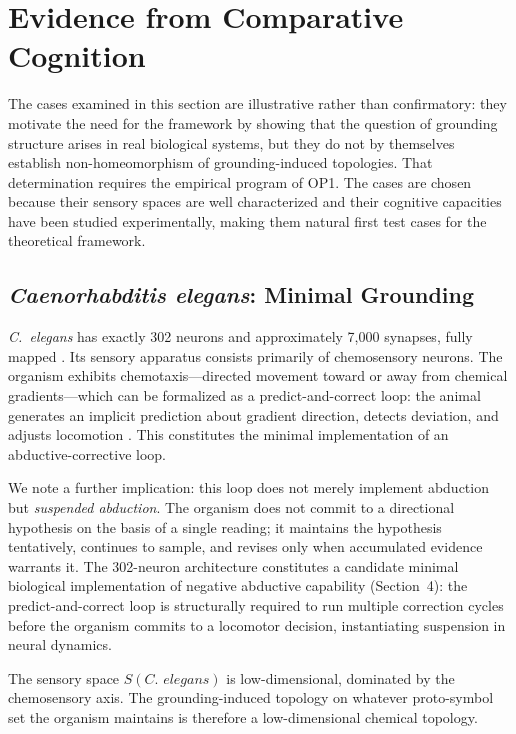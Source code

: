 \documentclass[12pt]{article}
\begin{document}
\section{Evidence from Comparative Cognition}

The cases examined in this section are illustrative rather than
confirmatory: they motivate the need for the framework by showing that
the question of grounding structure arises in real biological systems,
but they do not by themselves establish non-homeomorphism of
grounding-induced topologies.
That determination requires the empirical program of OP1.
The cases are chosen because their sensory spaces are well characterized
and their cognitive capacities have been studied experimentally, making
them natural first test cases for the theoretical framework.

\subsection{\textit{Caenorhabditis elegans}: Minimal Grounding}

\textit{C.~elegans} has exactly 302 neurons and approximately 7,000
synapses, fully mapped \cite{white1986}.
Its sensory apparatus consists primarily of chemosensory neurons.
The organism exhibits chemotaxis---directed movement toward or away
from chemical gradients---which can be formalized as a predict-and-correct
loop: the animal generates an implicit prediction about gradient direction,
detects deviation, and adjusts locomotion \cite{bargmann2006}.
This constitutes the minimal implementation of an abductive-corrective loop.

We note a further implication: this loop does not merely implement
abduction but \emph{suspended abduction}. The organism does not commit
to a directional hypothesis on the basis of a single reading; it maintains
the hypothesis tentatively, continues to sample, and revises only when
accumulated evidence warrants it.
The 302-neuron architecture constitutes a candidate minimal biological
implementation of negative abductive capability (Section~4):
the predict-and-correct loop is structurally required to run multiple
correction cycles before the organism commits to a locomotor decision,
instantiating suspension in neural dynamics.

The sensory space $S(\textit{C.~elegans})$ is low-dimensional, dominated
by the chemosensory axis. The grounding-induced topology on whatever
proto-symbol set the organism maintains is therefore a low-dimensional
chemical topology.
\end{document}

